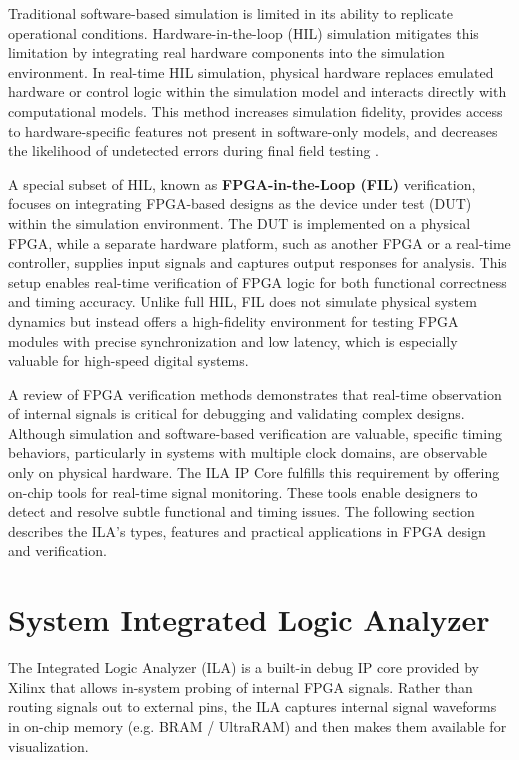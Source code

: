 Traditional software-based simulation is limited in its ability to replicate operational conditions. Hardware-in-the-loop (HIL) simulation mitigates this limitation by integrating real hardware components into the simulation environment. In real-time \acs{HIL} simulation, physical hardware replaces emulated hardware or control logic within the simulation model and interacts directly with computational models. This method increases simulation fidelity, provides access to hardware-specific features not present in software-only models, and decreases the likelihood of undetected errors during final field testing \cite{HIL}.

A special subset of \acs{HIL}, known as \textbf{\acs{FPGA}-in-the-Loop (FIL)} verification, focuses on integrating \acs{FPGA}-based designs as the device under test (DUT) within the simulation environment. The \acs{DUT} is implemented on a physical \acs{FPGA}, while a separate hardware platform, such as another \acs{FPGA} or a real-time controller, supplies input signals and captures output responses for analysis. This setup enables real-time verification of \acs{FPGA} logic for both functional correctness and timing accuracy. Unlike full \acs{HIL}, \acs{FIL} does not simulate physical system dynamics but instead offers a high-fidelity environment for testing \acs{FPGA} modules with precise synchronization and low latency, which is especially valuable for high-speed digital systems.

A review of \acs{FPGA} verification methods demonstrates that real-time observation of internal signals is critical for debugging and validating complex designs. Although simulation and software-based verification are valuable, specific timing behaviors, particularly in systems with multiple clock domains, are observable only on physical hardware. The \acs{ILA} \acs{IP} Core fulfills this requirement by offering on-chip tools for real-time signal monitoring. These tools enable designers to detect and resolve subtle functional and timing issues. The following section describes the \acs{ILA}’s types, features and practical applications in \acs{FPGA} design and verification.

\section{System Integrated Logic Analyzer}
\label{sec:TechBackground:SystemILA} 

\vspace{-1.0\baselineskip}
The Integrated Logic Analyzer (ILA) is a built-in debug \acs{IP} core provided by Xilinx that allows in-system probing of internal \acs{FPGA} signals. Rather than routing signals out to external pins, the \acs{ILA} captures internal signal waveforms in on-chip memory (e.g. BRAM / UltraRAM) and then makes them available for visualization.

